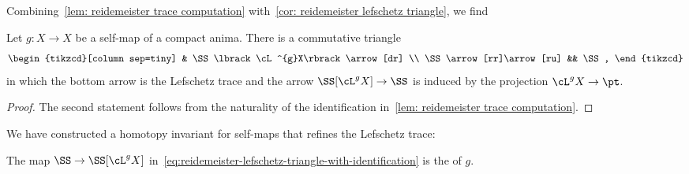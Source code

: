 Combining~\cref{lem: reidemeister trace computation} with~\cref{cor: reidemeister lefschetz triangle}, we find
\begin{thm}
  Let $g\colon X\to X$ be a self-map of a compact anima. There is a commutative triangle
  \begin{equation}
    \label{eq:reidemeister-lefschetz-triangle-with-identification}
    \begin{tikzcd}[column sep=tiny]
      & \SS\lbrack\cL^{g}X\rbrack\arrow[dr] \\
      \SS\arrow[rr]\arrow[ru] && \SS,
    \end{tikzcd}
  \end{equation}
  in which the bottom arrow is the Lefschetz trace and the arrow $\SS\lbrack\cL^{g}X\rbrack\to\SS$ is induced by the projection $\cL^{g}X\to\pt$.
\end{thm}
\begin{proof}
  The second statement follows from the naturality of the identification in~\cref{lem: reidemeister trace computation}.
\end{proof}
We have constructed a homotopy invariant for self-maps that refines the Lefschetz trace:
\begin{defn}
  The map $\SS\to\SS\lbrack\cL^{g}X\rbrack$ in~\eqref{eq:reidemeister-lefschetz-triangle-with-identification} is the  of $g$.
\end{defn}
